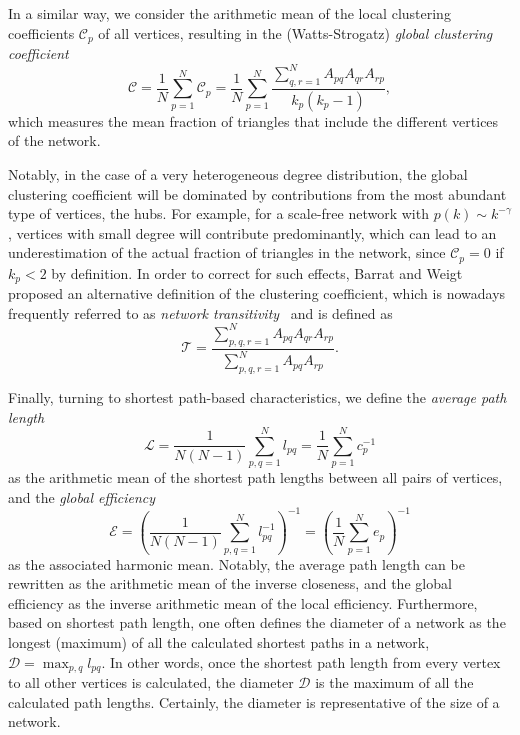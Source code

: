 		In a similar way, we consider the arithmetic mean of the local clustering coefficients $  {\mathcal{C}}_p $ of all vertices, resulting in the (Watts-Strogatz) \textit{global clustering coefficient}~\cite{Watts1998}
\begin{equation}
  {\mathcal{C}} =\frac{1}{N}\sum_{p=1}^N   {\mathcal{C}}_p 
= \frac{1}{N}\sum_{p=1}^N \frac{\sum_{q,r=1}^N A_{pq}  A_{qr}  A_{rp} }{  {k}_p (  {k}_p -1)}, 
\label{eq:globclustering}
\end{equation}
which measures the mean fraction of triangles that include the different vertices of the network. 

		Notably, in the case of a very heterogeneous degree distribution, the global clustering coefficient will be dominated by contributions from the most abundant type of vertices, the hubs. For example, for a scale-free network with $p(k)\sim k^{-\gamma}$, vertices with small degree will contribute predominantly, which can lead to an underestimation of the actual fraction of triangles in the network, since $  {\mathcal{C}}_p =0$ if $  {k}_p <2$ by definition. In order to correct for such effects, Barrat and Weigt~\cite{Barrat2000} proposed an alternative definition of the clustering coefficient, which is nowadays frequently referred to as \textit{network transitivity}~\cite{Boccaletti2006} and is defined as
\begin{equation}
  {\mathcal{T}} = \frac{\sum_{p,q,r=1}^N A_{pq}  A_{qr}  A_{rp} }{\sum_{p,q,r=1}^N A_{pq}  A_{rp} }.
\label{eq:transitivity}
\end{equation}
\noindent

	Finally, turning to shortest path-based characteristics, we define the \textit{average path length}
\begin{equation}
  {\mathcal{L}} =\frac{1}{N(N-1)} \sum_{p,q=1}^N   {l}_{pq}  = \frac{1}{N} \sum_{p=1}^N   {c}_p ^{-1}
\label{eq:apl}
\end{equation}
\noindent
as the arithmetic mean of the shortest path lengths between all pairs of vertices, and the \textit{global efficiency}
\begin{equation} 
  {\mathcal{E}} =\left(\frac{1}{N(N-1)} \sum_{p,q=1}^N   {l}_{pq} ^{-1} \right)^{-1} = \left( \frac{1}{N} \sum_{p=1}^N   {e}_p  \right)^{-1}
\label{eq:globefficiency}
\end{equation}
\noindent
as the associated harmonic mean. Notably, the average path length can be rewritten as the arithmetic mean of the inverse closeness, and the global efficiency as the inverse arithmetic mean of the local efficiency. Furthermore, based on shortest path length, one often defines the diameter of a network as the longest (maximum) of all the calculated shortest paths in a network, $\mathcal{D} = \max_{p,q} l_{pq}$. In other words, once the shortest path length from every vertex to all other vertices is calculated, the diameter $\mathcal{D}$ is the maximum of all the calculated path lengths. Certainly, the diameter is representative of the size of a network.       


